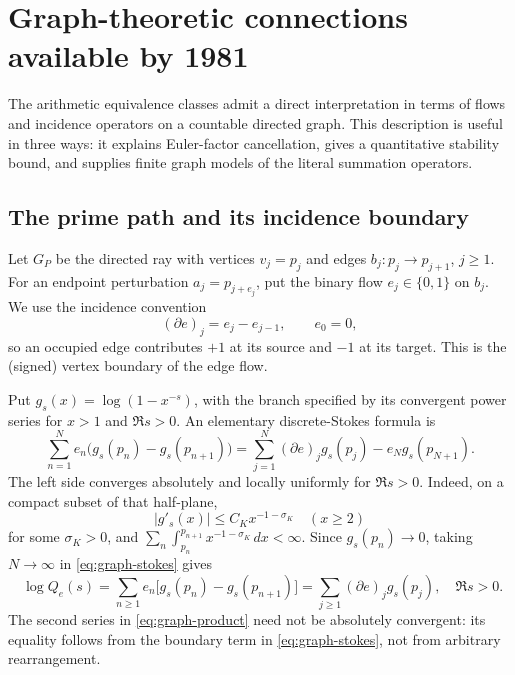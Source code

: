 \documentclass[12pt,letterpaper]{article}
\theoremstyle{definition}
\theoremstyle{remark}
\begin{document}
\section{Graph-theoretic connections available by 1981}
\label{sec:graphs}

The arithmetic equivalence classes admit a direct interpretation in terms of
flows and incidence operators on a countable directed graph.  This description
is useful in three ways: it explains Euler-factor cancellation, gives a
quantitative stability bound, and supplies finite graph models of the
literal summation operators.

\subsection{The prime path and its incidence boundary}

Let \(G_P\) be the directed ray with vertices \(v_j=p_j\) and edges
\(b_j:p_j\to p_{j+1}\), \(j\ge1\).  For an endpoint perturbation
\(a_j=p_{j+e_j}\), put the binary flow \(e_j\in\{0,1\}\) on \(b_j\).
We use the incidence convention
\[
 (\partial e)_j=e_j-e_{j-1},\qquad e_0=0,
\]
so an occupied edge contributes \(+1\) at its source and \(-1\) at its
target.  This is the (signed) vertex boundary of the edge flow.

\begin{center}
\end{center}

Put \(g_s(x)=\log(1-x^{-s})\), with the branch specified by its
convergent power series for \(x>1\) and \(\Re s>0\).
An elementary discrete-Stokes formula is
\begin{equation}\label{eq:graph-stokes}
 \sum_{n=1}^{N}e_n\bigl(g_s(p_n)-g_s(p_{n+1})\bigr)
 =\sum_{j=1}^{N}(\partial e)_j g_s(p_j)
       -e_Ng_s(p_{N+1}).
\end{equation}
The left side converges absolutely and locally uniformly for \(\Re s>0\).
Indeed, on a compact subset of that half-plane,
\[
 |g'_s(x)|\le C_K x^{-1-\sigma_K}\quad(x\ge2)
\]
for some \(\sigma_K>0\), and
\(\sum_n\int_{p_n}^{p_{n+1}}x^{-1-\sigma_K}\,dx<\infty\).
Since \(g_s(p_n)\to0\), taking \(N\to\infty\) in
\eqref{eq:graph-stokes} gives
\begin{equation}\label{eq:graph-product}
 \boxed{\quad
 \log Q_e(s)
 =\sum_{n\ge1}e_n\bigl[g_s(p_n)-g_s(p_{n+1})\bigr]
 =\sum_{j\ge1}(\partial e)_j g_s(p_j),\quad \Re s>0.
 \quad}
\end{equation}
The second series in \eqref{eq:graph-product} need not be absolutely
convergent: its equality follows from the boundary term in
\eqref{eq:graph-stokes}, not from arbitrary rearrangement.
\end{document}

